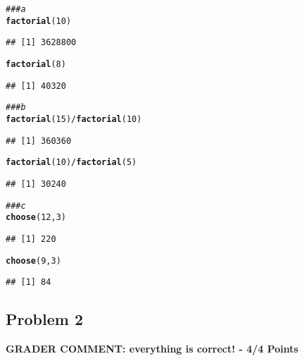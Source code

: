 \documentclass[12pt,letter]{article}\usepackage[]{graphicx}\usepackage[]{color}
\makeatletter
\newcommand{\hlnum}[1]{\textcolor[rgb]{0.686,0.059,0.569}{#1}}%
\newcommand{\hlcom}[1]{\textcolor[rgb]{0.678,0.584,0.686}{\textit{#1}}}%
\newcommand{\hlopt}[1]{\textcolor[rgb]{0,0,0}{#1}}%
\newcommand{\hlstd}[1]{\textcolor[rgb]{0.345,0.345,0.345}{#1}}%
\newcommand{\hlkwd}[1]{\textcolor[rgb]{0.737,0.353,0.396}{\textbf{#1}}}%
\newenvironment{kframe}{%
 \def\at@end@of@kframe{}%
 \ifinner\ifhmode%
  \def\at@end@of@kframe{\end{minipage}}%
  \begin{minipage}{\columnwidth}%
 \fi\fi%
 \def\FrameCommand##1{\hskip\@totalleftmargin \hskip-\fboxsep
 \colorbox{shadecolor}{##1}\hskip-\fboxsep
     \hskip-\linewidth \hskip-\@totalleftmargin \hskip\columnwidth}%
 \MakeFramed {\advance\hsize-\width
   \@totalleftmargin\z@ \linewidth\hsize
   \@setminipage}}%
 {\par\unskip\endMakeFramed%
 \at@end@of@kframe}
\newenvironment{knitrout}{}{} %
\makeatother
\begin{document}
\begin{knitrout}
\color{fgcolor}\begin{kframe}
\begin{alltt}
\hlcom{### a}
\hlkwd{factorial}\hlstd{(}\hlnum{10}\hlstd{)}
\end{alltt}
\begin{verbatim}
## [1] 3628800
\end{verbatim}
\begin{alltt}
\hlkwd{factorial}\hlstd{(}\hlnum{8}\hlstd{)}
\end{alltt}
\begin{verbatim}
## [1] 40320
\end{verbatim}
\begin{alltt}
\hlcom{### b}
\hlkwd{factorial}\hlstd{(}\hlnum{15}\hlstd{)}\hlopt{/}\hlkwd{factorial}\hlstd{(}\hlnum{10}\hlstd{)}
\end{alltt}
\begin{verbatim}
## [1] 360360
\end{verbatim}
\begin{alltt}
\hlkwd{factorial}\hlstd{(}\hlnum{10}\hlstd{)}\hlopt{/}\hlkwd{factorial}\hlstd{(}\hlnum{5}\hlstd{)}
\end{alltt}
\begin{verbatim}
## [1] 30240
\end{verbatim}
\begin{alltt}
\hlcom{### c}
\hlkwd{choose}\hlstd{(}\hlnum{12}\hlstd{,} \hlnum{3}\hlstd{)}
\end{alltt}
\begin{verbatim}
## [1] 220
\end{verbatim}
\begin{alltt}
\hlkwd{choose}\hlstd{(}\hlnum{9}\hlstd{,} \hlnum{3}\hlstd{)}
\end{alltt}
\begin{verbatim}
## [1] 84
\end{verbatim}
\end{kframe}
\end{knitrout}



\subsection*{Problem 2}

\textbf{\color{red} GRADER COMMENT: everything is correct! - 4/4 Points}
\end{document}
